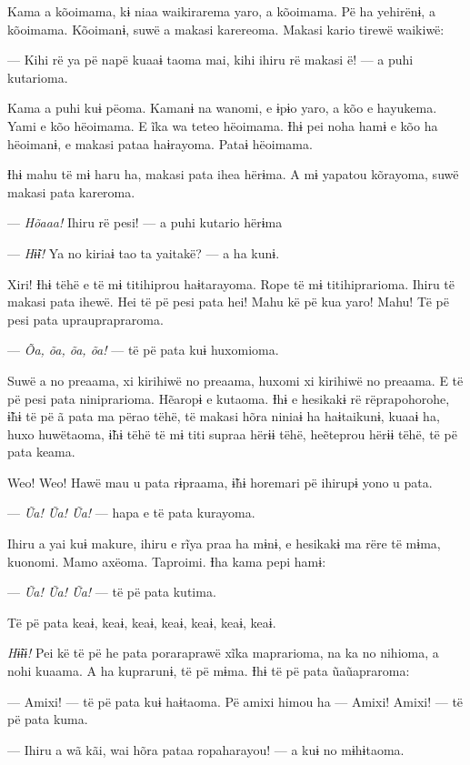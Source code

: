 Kama a kõoimama, kɨ niaa waikirarema yaro, a kõoimama. Pë ha yehirënɨ, a
kõoimama. Kõoimanɨ, suwë a makasi karereoma. Makasi kario tirewë
waikiwë:

--- Kihi rë ya pë napë kuaaɨ taoma mai, kihi ihiru rë makasi ë! --- a
 puhi kutarioma. 

Kama a puhi kuɨ pëoma. Kamanɨ na wanomi, e ɨpɨo yaro, a kõo e hayukema.
Yami e kõo hëoimama. E ĩka wa teteo hëoimama. Ɨhɨ pei noha hamɨ e kõo ha
hëoimanɨ, e makasi pataa haɨrayoma. Pataɨ hëoimama. 

Ɨhɨ mahu të mɨ haru ha, makasi pata ihea hërɨma. A mɨ yapatou kõrayoma,
suwë makasi pata kareroma. 

--- \textit{Hõaaa!} Ihiru rë pesi! --- a puhi kutario hërɨma 

--- \textit{Hɨ̃ɨ! }Ya no kiriaɨ tao ta yaitakë? --- a ha kunɨ. 

Xiri! Ɨhɨ tëhë e të mɨ titihiprou haɨtarayoma. Rope të mɨ
 titihiprarioma. Ihiru të makasi pata ihewë. Hei të pë pesi pata hei!
 Mahu kë pë kua yaro! Mahu! Të pë pesi pata uprauprapraroma. 

--- \textit{Õa, õa, õa, õa!} --- të pë pata kuɨ huxomioma. 

Suwë a no preaama, xi kirihiwë no preaama, huxomi xi kirihiwë no
 preaama. E të pë pesi pata niniprarioma. Hẽaropɨ e kutaoma. Ɨhɨ e
 hesikakɨ rë rëprapohorohe, ɨ̃hɨ të pë ã pata ma përao tëhë, të makasi
 hõra niniaɨ ha haɨtaikunɨ, kuaaɨ ha, huxo huwëtaoma, ɨ̃hɨ tëhë të mɨ titi
 supraa hërɨɨ tëhë, heẽteprou hërɨɨ tëhë, të pë pata keama.

Weo! Weo! Hawë mau u pata rɨpraama, ɨ̃hɨ horemari pë ihirupɨ yono u
pata. 

--- \textit{Ũa! Ũa! Ũa!} --- hapa e të pata kurayoma. 

Ihiru a yai kuɨ makure, ihiru e rĩya praa ha mɨnɨ, e hesikakɨ ma rëre të
mɨma, kuonomi. Mamo axëoma. Taproimi. Ɨha kama pepi hamɨ: 

--- \textit{Ũa! Ũa! Ũa!} --- të pë pata kutima. 

Të pë pata keaɨ, keaɨ, keaɨ, keaɨ, keaɨ, keaɨ, keaɨ. 

\textit{Hɨ̃ɨɨ! }Pei kë të pë he pata poraraprawë xĩka maprarioma, na ka no
nihioma, a nohi kuaama. A ha kuprarunɨ, të pë mɨma. Ɨhɨ të pë pata
ũaũapraroma: 

--- Amixi! --- të pë pata kuɨ haɨtaoma. Pë amixi himou ha --- Amixi!
Amixi! --- të pë pata kuma.

--- Ihiru a wã kãi, wai hõra pataa ropaharayou! --- a kuɨ no mɨhɨtaoma.

